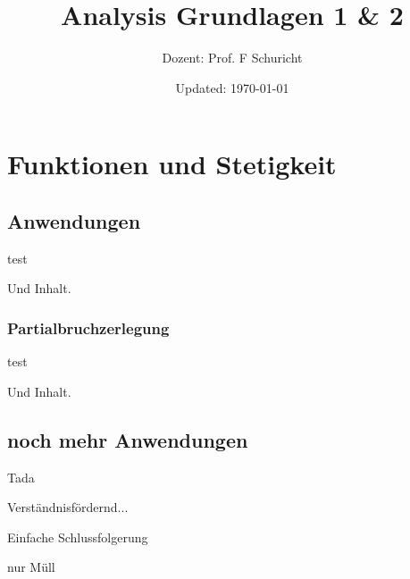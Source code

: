 \documentclass[ngerman,a4paper]{report}
\author{Dozent: Prof. F Schuricht}
\title{Analysis Grundlagen 1 \& 2} %
\date{Updated: \today}
\theoremstyle{break}
\numberwithin{dummy}{section}
\begin{document}
\maketitle
\tableofcontents

\chapter{Funktionen und Stetigkeit}

\section{Anwendungen}

\begin{truetheorem}
    test
\end{truetheorem}

\begin{trueproposition}
    Und Inhalt.
\end{trueproposition}

\subsection{Partialbruchzerlegung}
	
\begin{truetheorem}
	test
\end{truetheorem}
	
\begin{trueproposition}
	Und Inhalt.
\end{trueproposition}

\section{noch mehr Anwendungen}

\begin{truedefinition}
	Tada
\end{truedefinition}

\begin{trueexample}
	Verständnisfördernd...
\end{trueexample}

\begin{trueconclusion}[Ergänzung]
	Einfache Schlussfolgerung
\end{trueconclusion}

\begin{truelemma}
	nur Müll
\end{truelemma}
\end{document}
